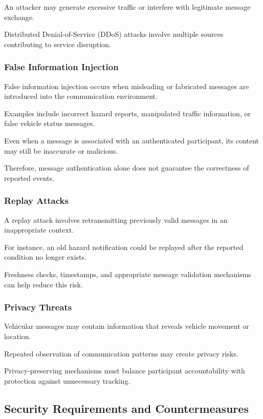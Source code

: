 An attacker may
generate excessive
traffic or interfere
with legitimate
message exchange.

Distributed
Denial-of-Service
(DDoS) attacks
involve multiple
sources contributing
to service disruption.

\subsubsection{False Information Injection}

False information
injection occurs
when misleading
or fabricated
messages are
introduced into
the communication
environment.

Examples include
incorrect hazard
reports, manipulated
traffic information,
or false vehicle
status messages.

Even when a message
is associated with
an authenticated
participant, its
content may still
be inaccurate
or malicious.

Therefore, message
authentication alone
does not guarantee
the correctness
of reported events.

\subsubsection{Replay Attacks}

A replay attack
involves retransmitting
previously valid
messages in an
inappropriate context.

For instance,
an old hazard
notification could
be replayed after
the reported
condition no
longer exists.

Freshness checks,
timestamps, and
appropriate message
validation mechanisms
can help reduce
this risk.

\subsubsection{Privacy Threats}

Vehicular messages
may contain information
that reveals
vehicle movement
or location.

Repeated observation
of communication
patterns may create
privacy risks.

Privacy-preserving
mechanisms must
balance participant
accountability with
protection against
unnecessary tracking.

\subsection{Security Requirements and Countermeasures}
\label{sec:3E}


